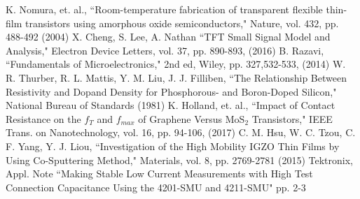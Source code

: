 \documentclass[conference]{IEEEtran}
\begin{document}
\begin{thebibliography}{00}
     K. Nomura, et. al., ``Room-temperature fabrication of transparent flexible thin-film transistors using amorphous oxide semiconductors," Nature, vol. 432, pp. 488-492 (2004)
     X. Cheng, S. Lee, A. Nathan ``TFT Small Signal Model and Analysis," Electron Device Letters, vol. 37, pp. 890-893, (2016)
     B. Razavi, ``Fundamentals of Microelectronics," 2nd ed, Wiley, pp. 327,532-533, (2014)
     W. R. Thurber, R. L. Mattis, Y. M. Liu, J. J. Filliben, ``The Relationship Between Resistivity and Dopand Density for Phosphorous- and Boron-Doped Silicon," National Bureau of Standards (1981)
     K. Holland, et. al., ``Impact of Contact Resistance on the $f_T$ and $f_{max}$ of Graphene Versus MoS$_2$ Transistors," IEEE Trans. on Nanotechnology, vol. 16, pp. 94-106, (2017)
     C. M. Hsu, W. C. Tzou, C. F. Yang, Y. J. Liou, ``Investigation of the High Mobility IGZO Thin Films by Using Co-Sputtering Method," Materials, vol. 8, pp. 2769-2781 (2015)
     Tektronix, Appl. Note ``Making Stable Low Current Measurements with High Test Connection Capacitance Using the 4201-SMU and 4211-SMU" pp. 2-3

\end{thebibliography}
\end{document}

